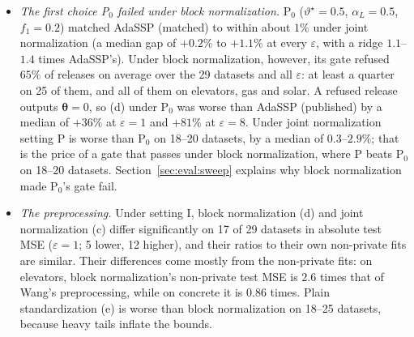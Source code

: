 \documentclass[11pt]{article}
\theoremstyle{definition}
\theoremstyle{plain}
\newcommand{\btheta}{\boldsymbol{\theta}}
\begin{document}
\begin{itemize}
  \item \emph{The first choice P$_0$ failed under block normalization.} P$_0$ ($\vartheta^\star = 0.5$, $\alpha_L = 0.5$, $f_1 = 0.2$) matched AdaSSP (matched) to within about $1\%$ under joint normalization (a median gap of $+0.2\%$ to $+1.1\%$ at every $\varepsilon$, with a ridge $1.1$--$1.4$ times AdaSSP's). Under block normalization, however, its gate refused $65\%$ of releases on average over the 29 datasets and all $\varepsilon$: at least a quarter on 25 of them, and all of them on elevators, gas and solar. A refused release outputs $\btheta = 0$, so (d) under P$_0$ was worse than AdaSSP (published) by a median of $+36\%$ at $\varepsilon = 1$ and $+81\%$ at $\varepsilon = 8$. Under joint normalization setting P is worse than P$_0$ on 18--20 datasets, by a median of $0.3$--$2.9\%$; that is the price of a gate that passes under block normalization, where P beats P$_0$ on 18--20 datasets. Section~\ref{sec:eval:sweep} explains why block normalization made P$_0$'s gate fail.
  \item \emph{The preprocessing.} Under setting I, block normalization (d) and joint normalization (c) differ significantly on 17 of 29 datasets in absolute test MSE ($\varepsilon = 1$; 5 lower, 12 higher), and their ratios to their own non-private fits are similar. Their differences come mostly from the non-private fits: on elevators, block normalization's non-private test MSE is $2.6$ times that of Wang's preprocessing, while on concrete it is $0.86$ times. Plain standardization (e) is worse than block normalization on 18--25 datasets, because heavy tails inflate the bounds.
\end{itemize}
\end{document}
